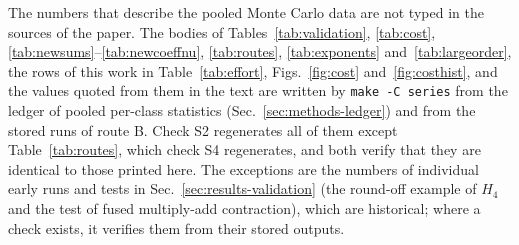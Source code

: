 The numbers that describe the pooled Monte Carlo data are not typed in the sources of the paper. The bodies of
Tables~\ref{tab:validation}, \ref{tab:cost}, \ref{tab:newsums}--\ref{tab:newcoeffnu}, \ref{tab:routes},
\ref{tab:exponents} and~\ref{tab:largeorder}, the rows of this work in Table~\ref{tab:effort}, Figs.~\ref{fig:cost}
and~\ref{fig:costhist}, and the values quoted from them in the text are written by \texttt{make -C series} from the
ledger of pooled per-class statistics (Sec.~\ref{sec:methods-ledger}) and from the stored runs of route B. Check S2
regenerates all of them except Table~\ref{tab:routes}, which check S4 regenerates, and both verify that they are
identical to those printed here. The exceptions are the numbers of individual early runs and tests in
Sec.~\ref{sec:results-validation} (the round-off example of $H_4$ and the test of fused multiply-add contraction),
which are historical; where a check exists, it verifies them from their stored outputs.

